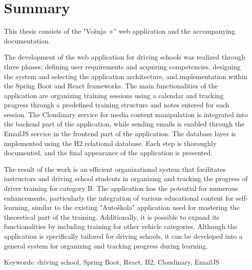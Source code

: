 \chapter*{Summary}
\noindent This thesis consists of the "Vožnja +" web application and the accompanying documentation.\

\noindent The development of the web application for driving schools was realized through three phases: defining user requirements and acquiring competencies, designing the system and selecting the application architecture, and implementation within the Spring Boot and React frameworks. The main functionalities of the application are organizing training sessions using a calendar and tracking progress through a predefined training structure and notes entered for each session. The Cloudinary service for media content manipulation is integrated into the backend part of the application, while sending emails is enabled through the EmailJS service in the frontend part of the application. The database layer is implemented using the H2 relational database. Each step is thoroughly documented, and the final appearance of the application is presented.\

\noindent The result of the work is an efficient organizational system that facilitates instructors and driving school students in organizing and tracking the progress of driver training for category B. The application has the potential for numerous enhancements, particularly the integration of various educational content for self-learning, similar to the existing "Autoškola" application used for mastering the theoretical part of the training. Additionally, it is possible to expand its functionalities by including training for other vehicle categories. Although the application is specifically tailored for driving schools, it can be developed into a general system for organizing and tracking progress during learning.

\vspace{1cm}
\noindent Keywords: driving school, Spring Boot, React, H2, Cloudinary, EmailJS